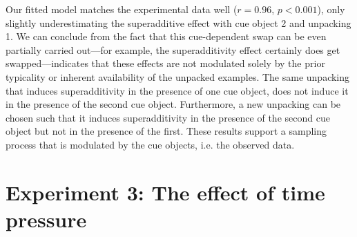 
Our fitted model matches the experimental data well ($r=0.96$, $p<0.001$), only slightly underestimating the superadditive effect with cue object 2 and unpacking 1. We can conclude from the fact that this cue-dependent swap can be even partially carried out---for example, the superadditivity effect certainly does get swapped---indicates that these effects are not modulated solely by the prior typicality or inherent availability of the unpacked examples. The same unpacking that induces superadditivity in the presence of one cue object, does not induce it in the presence of the second cue object. Furthermore, a new unpacking can be chosen such that it induces superadditivity in the presence of the second cue object but not in the presence of the first. These results support a sampling process that is modulated by the cue objects, i.e. the observed data.



\section{Experiment 3: The effect of time pressure}

